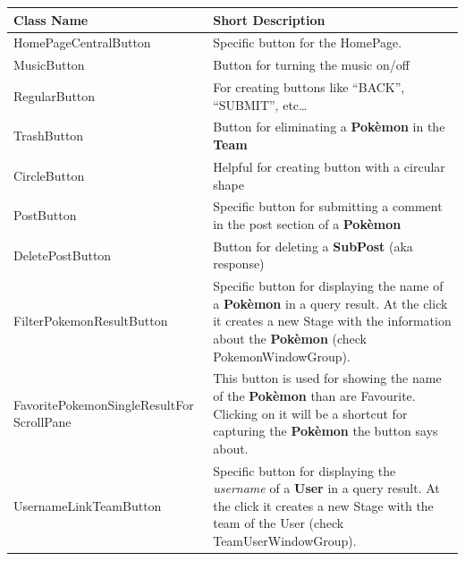 \begin{center}
	\begin{longtable}{| m{14em} | m{19em} |} 
		\hline
		\textbf{Class Name} & \textbf{Short Description} \\ [0.5ex] 
		\hline
		HomePageCentralButton & Specific button for the HomePage.\\ 
		\hline
		MusicButton & Button for turning the music on/off\\ 
		\hline
		RegularButton & For creating buttons like “BACK”, “SUBMIT”, etc…\\ 
		\hline
		TrashButton & Button for eliminating a \textbf{Pokèmon} in the \textbf{Team}\\ 
		\hline
		CircleButton & Helpful for creating button with a circular shape\\ 
		\hline
		PostButton & Specific button for submitting a comment in the post section of a \textbf{Pokèmon}\\
		\hline
		DeletePostButton & Button for deleting a \textbf{SubPost} (aka response)\\
		\hline
		FilterPokemonResultButton & Specific button for displaying the name of a \textbf{Pokèmon} in a query result. At the click it creates a new Stage with the information about the \textbf{Pokèmon} (check PokemonWindowGroup).\\
		\hline
		FavoritePokemonSingleResultFor ScrollPane & This button is used for showing the name of the \textbf{Pokèmon} than are Favourite. Clicking on it will be a shortcut for capturing the \textbf{Pokèmon} the button says about.\\
		\hline
		UsernameLinkTeamButton & Specific button for displaying the \textit{username} of a \textbf{User} in a query result. At the click it creates a new Stage with the team of the User (check TeamUserWindowGroup).\\
		\hline
	\end{longtable}
\end{center}
\endgroup

